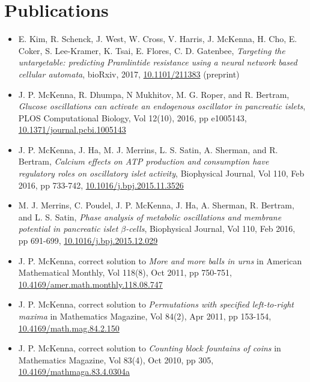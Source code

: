 \documentclass[11pt]{cv}
\begin{document}
\section*{Publications}
\label{sec:orga4bbe18}
\begin{itemize}
\item E. Kim, R. Schenck, J. West, W. Cross, V. Harris, J. McKenna, H. Cho, E. Coker, S. Lee-Kramer, K. Tsai, E. Flores, C. D. Gatenbee, \emph{Targeting the untargetable: predicting Pramlintide resistance using a neural network based cellular automata}, bioRxiv, 2017, \href{http://dx.doi.org/10.1101/211383}{10.1101/211383} (preprint)\\
\item J. P. McKenna, R. Dhumpa, N Mukhitov, M. G. Roper, and R. Bertram, \emph{Glucose oscillations can activate an endogenous oscillator in pancreatic islets}, PLOS Computational Biology, Vol 12(10), 2016, pp e1005143, \href{http://dx.doi.org/10.1371/journal.pcbi.1005143}{10.1371/journal.pcbi.1005143}\\
\item J. P. McKenna, J. Ha, M. J. Merrins, L. S. Satin, A. Sherman, and R. Bertram, \emph{Calcium effects on ATP production and consumption have regulatory roles on oscillatory islet activity}, Biophysical Journal, Vol 110, Feb 2016, pp 733-742, \href{http://dx.doi.org/10.1016/j.bpj.2015.11.3526}{10.1016/j.bpj.2015.11.3526}\\
\item M. J. Merrins, C. Poudel, J. P. McKenna, J. Ha, A. Sherman, R. Bertram, and L. S. Satin, \emph{Phase analysis of metabolic oscillations and membrane potential in pancreatic islet \(\beta\)-cells}, Biophysical Journal, Vol 110, Feb 2016, pp 691-699, \href{http://dx.doi.org/10.1016/j.bpj.2015.12.029}{10.1016/j.bpj.2015.12.029}\\
\item J. P. McKenna, correct solution to \emph{More and more balls in urns} in American Mathematical Monthly, Vol 118(8), Oct 2011, pp 750-751, \href{http://dx.doi.org/10.4169/amer.math.monthly.118.08.747}{10.4169/amer.math.monthly.118.08.747}\\
\item J. P. McKenna, correct solution to \emph{Permutations with specified left-to-right maxima} in Mathematics Magazine, Vol 84(2), Apr 2011, pp 153-154, \href{http://dx.doi.org/10.4169/math.mag.84.2.150}{10.4169/math.mag.84.2.150}\\
\item J. P. McKenna, correct solution to \emph{Counting block fountains of coins} in Mathematics Magazine, Vol 83(4), Oct 2010, pp 305, \href{http://www.jstor.org/stable/10.4169/mathmaga.83.4.0304a}{10.4169/mathmaga.83.4.0304a}\\
\end{itemize}
\end{document}
